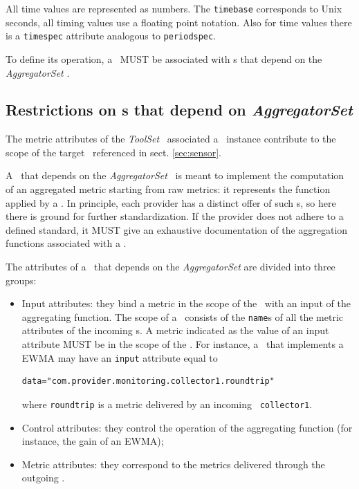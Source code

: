 \documentclass[12pt]{article}  %
\begin{document}
All time values are represented as numbers. The {\tt timebase} corresponds to Unix seconds, all timing values use a floating point notation. Also for time values there is a {\tt timespec} attribute analogous to {\tt periodspec}.

To define its operation, a \sens\ MUST be associated with \mi s that depend on the {\em AggregatorSet} \mi .

\subsection{Restrictions on \mi s that depend on {\em AggregatorSet} \label{sec:Aggregator}}

The metric attributes of the {\em ToolSet} \mi\ associated a \coll\ instance contribute to the scope of the target \sens\ referenced in sect. \ref{sec:sensor}.

A \mi\ that depends on the {\em AggregatorSet} \mi\ is meant to implement the computation of an aggregated metric starting from raw metrics: it represents the function applied by a \sens. In principle, each provider has a distinct offer of such \mi s, so here there is ground for further standardization. If the provider does not adhere to a defined standard, it MUST give an exhaustive documentation of the aggregation functions associated with a \mi.

The attributes of a \mi\ that depends on the {\em AggregatorSet} are divided into three groups:

\begin{itemize}
\item Input attributes: they bind a metric in the scope of the \sens\ with an input of the aggregating function. The scope of a \sens\ consists of the {\tt name}s of all the metric attributes of the incoming \coll s. A metric indicated as the value of an input attribute MUST be in the scope of the \sens . For instance, a \sens\ that implements a EWMA may have an {\tt input} attribute equal to 
\begin{verbatim}
data="com.provider.monitoring.collector1.roundtrip"
\end{verbatim}
where \verb&roundtrip& is a metric delivered by an incoming \coll\ {\tt collector1}.
\item Control attributes: they control the operation of the aggregating function (for instance, the gain of an EWMA);
\item Metric attributes: they correspond to the metrics delivered through the outgoing \coll.
\end{itemize}
\end{document}
